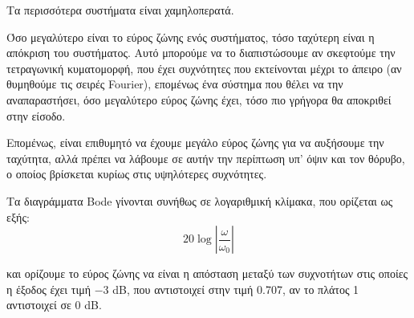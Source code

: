 \documentclass[11pt,a4paper,notitlepage,fleqn,final]{article}
\begin{document}
Τα περισσότερα συστήματα είναι χαμηλοπερατά.

Όσο μεγαλύτερο είναι το εύρος ζώνης ενός συστήματος, τόσο ταχύτερη είναι η απόκριση του
συστήματος. Αυτό μπορούμε να το διαπιστώσουμε αν σκεφτούμε την τετραγωνική κυματομορφή,
που έχει συχνότητες που εκτείνονται μέχρι το άπειρο (αν θυμηθούμε τις σειρές Fourier),
επομένως ένα σύστημα που θέλει να την αναπαραστήσει, όσο μεγαλύτερο εύρος ζώνης έχει,
τόσο πιο γρήγορα θα αποκριθεί στην είσοδο.


Επομένως, είναι επιθυμητό να έχουμε μεγάλο εύρος ζώνης για να αυξήσουμε την ταχύτητα, αλλά
πρέπει να λάβουμε σε αυτήν την περίπτωση υπ' όψιν και τον θόρυβο, ο οποίος βρίσκεται κυρίως
στις υψηλότερες συχνότητες.

Τα διαγράμματα Bode γίνονται συνήθως σε λογαριθμική κλίμακα, που ορίζεται ως εξής:
\[
20\log\left\lvert \frac{\omega}{\omega_0} \right\rvert
\]


και ορίζουμε το εύρος ζώνης να είναι η απόσταση μεταξύ των συχνοτήτων στις οποίες η έξοδος
έχει τιμή \(-3\) dB, που αντιστοιχεί στην τιμή 0.707, αν το πλάτος 1 αντιστοιχεί σε 0 dB.
\end{document}
